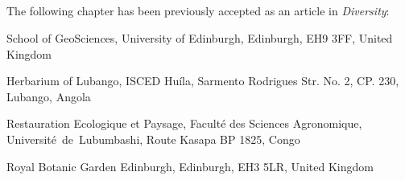 \begin{refsection}








\chapter[\chaptertitle]{\chaptertitle}
\label{ch:bicuar}

The following chapter has been previously accepted as an article in \textit{Diversity}:



\begin{paperaffil}
\item{School of GeoSciences, University of Edinburgh, Edinburgh, EH9 3FF, United Kingdom}
\item{Herbarium of Lubango, ISCED Hu\'{i}la, Sarmento Rodrigues Str. No. 2, CP. 230, Lubango, Angola}
\item{Restauration Ecologique et Paysage, Facult\'{e} des Sciences Agronomique, Universit\'{e}~de~Lubumbashi, Route Kasapa BP 1825, Congo}
\item{Royal Botanic Garden Edinburgh, Edinburgh, EH3 5LR, United Kingdom}
\end{paperaffil}



\end{refsection}
